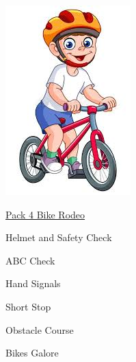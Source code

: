 \documentclass[12pt]{article}
\begin{document}
\begin{minipage}{.5\textwidth}
\noindent\includegraphics[width = \textwidth]{bike.jpg}
\end{minipage}\begin{minipage}{.5\textwidth}
\huge \underline{Pack 4 Bike Rodeo}
\begin{todolist}
\item Helmet and Safety Check
\item ABC Check
\item Hand Signals
\item Short Stop
\item Obstacle Course
\item Bikes Galore
\end{todolist}
\end{minipage}
\end{document}
